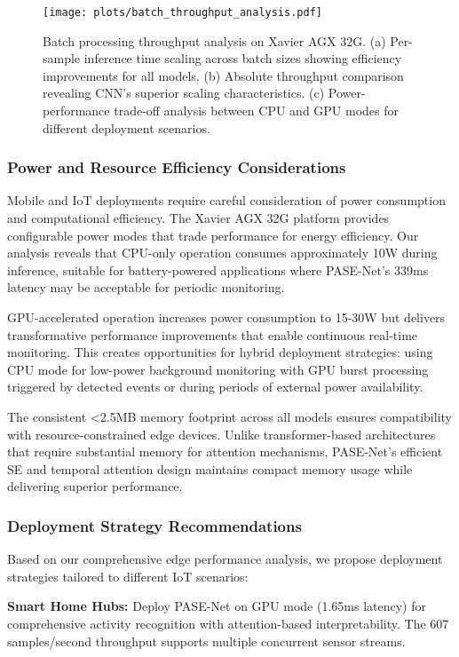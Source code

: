 \begin{figure}[t]
\centering
\texttt{[image: plots/batch\_throughput\_analysis.pdf]}
\caption{Batch processing throughput analysis on Xavier AGX 32G. (a) Per-sample inference time scaling across batch sizes showing efficiency improvements for all models. (b) Absolute throughput comparison revealing CNN's superior scaling characteristics. (c) Power-performance trade-off analysis between CPU and GPU modes for different deployment scenarios.}
\label{fig:batch_throughput}
\end{figure}

\subsubsection{Power and Resource Efficiency Considerations}

Mobile and IoT deployments require careful consideration of power consumption and computational efficiency. The Xavier AGX 32G platform provides configurable power modes that trade performance for energy efficiency. Our analysis reveals that CPU-only operation consumes approximately 10W during inference, suitable for battery-powered applications where PASE-Net's 339ms latency may be acceptable for periodic monitoring.

GPU-accelerated operation increases power consumption to 15-30W but delivers transformative performance improvements that enable continuous real-time monitoring. This creates opportunities for hybrid deployment strategies: using CPU mode for low-power background monitoring with GPU burst processing triggered by detected events or during periods of external power availability.

The consistent <2.5MB memory footprint across all models ensures compatibility with resource-constrained edge devices. Unlike transformer-based architectures that require substantial memory for attention mechanisms, PASE-Net's efficient SE and temporal attention design maintains compact memory usage while delivering superior performance.

\subsubsection{Deployment Strategy Recommendations}

Based on our comprehensive edge performance analysis, we propose deployment strategies tailored to different IoT scenarios:

\textbf{Smart Home Hubs:} Deploy PASE-Net on GPU mode (1.65ms latency) for comprehensive activity recognition with attention-based interpretability. The 607 samples/second throughput supports multiple concurrent sensor streams.

